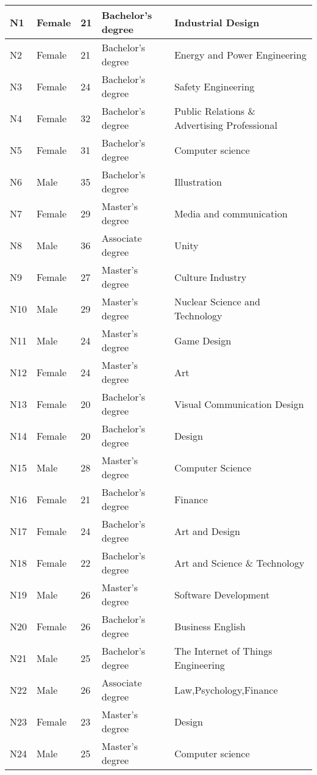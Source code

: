 \begin{longtable}{|p{1cm}|p{1.5cm}|p{0.8cm}|p{4cm}|p{4cm}|}
N1  & Female & 21 & Bachelor's degree & Industrial Design \\ \hline
N2  & Female & 21 & Bachelor's degree & Energy and Power Engineering \\ \hline
N3  & Female & 24 & Bachelor's degree & Safety Engineering \\ \hline
N4  & Female & 32 & Bachelor's degree & Public Relations \& Advertising Professional \\ \hline
N5  & Female & 31 & Bachelor's degree & Computer science \\ \hline
N6  & Male   & 35 & Bachelor's degree & Illustration \\ \hline
N7  & Female & 29 & Master's degree   & Media and communication \\ \hline
N8  & Male   & 36 & Associate degree  & Unity \\ \hline
N9  & Female & 27 & Master's degree & Culture Industry \\ \hline
N10 & Male   & 29 & Master's degree   & Nuclear Science and Technology \\ \hline
N11 & Male   & 24 & Master's degree   & Game Design \\ \hline
N12 & Female & 24 & Master's degree   & Art \\ \hline
N13 & Female & 20 & Bachelor's degree & Visual Communication Design \\ \hline
N14 & Female & 20 & Bachelor's degree & Design \\ \hline
N15 & Male   & 28 & Master's degree   & Computer Science \\ \hline
N16 & Female & 21 & Bachelor's degree & Finance \\ \hline
N17 & Female & 24 & Bachelor's degree & Art and Design \\ \hline
N18 & Female & 22 & Bachelor's degree & Art and Science \& Technology \\ \hline
N19 & Male   & 26 & Master's degree   & Software Development \\ \hline
N20 & Female   & 26 & Bachelor’s degree  & Business English \\ \hline
N21 & Male & 25 & Bachelor's degree & The Internet of Things Engineering \\ \hline
N22 & Male   & 26 & Associate degree   & Law,Psychology,Finance \\ \hline
N23 & Female & 23 & Master's degree & Design \\ \hline
N24 & Male & 25 & Master's degree   & Computer science \\ \hline

\end{longtable}
